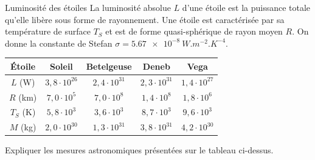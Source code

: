 \begin{exo}[PC][1][colle]{Luminosité des étoiles}
La luminosité absolue $L$ d'une étoile est la puissance totale qu'elle libère sous forme de rayonnement. Une étoile est caractérisée par sa température de surface $T_S$ et est de forme quasi-sphérique de rayon moyen $R$. On donne la constante de Stefan $\sigma = \SI{5.67e-8}{W.m^{-2}.K^{-4}}$.

\begin{center}
\begin{tabular}{|c|c|c|c|c|}
\hline
Étoile & Soleil & Betelgeuse & Deneb & Vega \\
\hline
 $L$ (W) & $3,8 \cdot 10^{26}$ & $2,4 \cdot 10^{31}$ & $2,3 \cdot 10^{31}$ & $1,4 \cdot 10^{27}$\\
\hline
$R$ (km) & $7,0 \cdot 10^5$ & $7,0 \cdot 10^8$ & $1,4 \cdot 10^8$ & $1,8 \cdot 10^6$\\
\hline
$T_S$ (K) & $5,8 \cdot 10^3$ & $3,6 \cdot 10^3$ & $8,7 \cdot 10^3$ & $9,6 \cdot 10^3$\\
\hline
$M$ (kg) & $2,0 \cdot 10^{30}$ & $1,3 \cdot 10^{31}$ & $3,8 \cdot 10^{31}$ & $4,2 \cdot 10^{30}$\\
\hline
\end{tabular}
\end{center}

\begin{quest}
	\item Expliquer les mesures astronomiques présentées sur le tableau ci-dessus.
\end{quest}
\end{exo}
